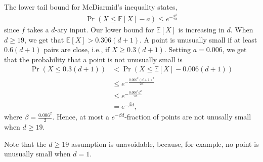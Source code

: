 \documentclass[11pt,letterpaper]{article}
\theoremstyle{definition}
\newcommand{\EE}{\mathbb{E}}
\begin{document}
The lower tail bound for McDiarmid's inequality states, 
\begin{align*}
    \Pr(X\leq \EE[X]-a)\leq e^{-\frac{a^2}{2d}}
\end{align*}
since $f$ takes a $d$-ary input.
Our lower bound for $\EE[X]$ is increasing in $d$. 
When $d\geq 19$, we get that $\EE[X]>0.306(d+1)$.
A point is unusually small if at least $0.6(d+1)$ pairs are close, i.e., if $X\geq 0.3(d+1)$.
Setting $a=0.006$, we get that the probability that a point is not unusually small is
\begin{align*}
    \Pr(X\leq 0.3(d+1)) &<\Pr(X\leq \EE[X] - 0.006(d+1)) \\
    &\leq e^{-\frac{0.006^2(d+1)^2}{2d}} \\
    &\leq e^{-\frac{0.006^2 d^2}{2d}} \\
    &= e^{-\beta d},
\end{align*}
where $\beta = \frac{0.006^2}{2}$.
Hence, at most a $e^{-\beta d}$-fraction of points are not unusally small when $d\geq 19$.

Note that the $d\geq 19$ assumption is unavoidable, because, for example, no point is unusually small when $d=1$.

\end{document}
